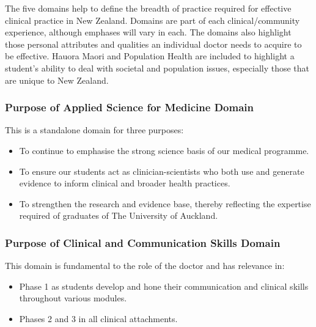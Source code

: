 \documentclass[11pt,fleqn]{book} %
\begin{document}
The five domains help to define the breadth of practice required for effective clinical practice in New Zealand.  Domains are part of each clinical/community experience, although emphases will vary in each.  The domains also highlight those personal attributes and qualities an individual doctor needs to acquire to be effective.  Hauora Maori and Population Health are included to highlight a student's ability to deal with societal and population issues, especially those that are unique to New Zealand. 

\subsubsection{Purpose of Applied Science for Medicine Domain}
This is a standalone domain for three purposes:
\begin{itemize}
\item To continue to emphasise the strong science basis of our medical programme.
\item To ensure our students act as clinician-scientists who both use and generate evidence to inform clinical and broader health practices. 
\item To strengthen the research and evidence base, thereby reflecting the expertise required of graduates of The University of Auckland. 
\end{itemize}

\subsubsection{Purpose of Clinical and Communication Skills Domain}
This domain is fundamental to the role of the doctor and has relevance in: 
\begin{itemize}
\item Phase 1 as students develop and hone their communication and clinical skills throughout various modules.
\item Phases 2 and 3 in all clinical attachments.
\end{itemize}
\end{document}
